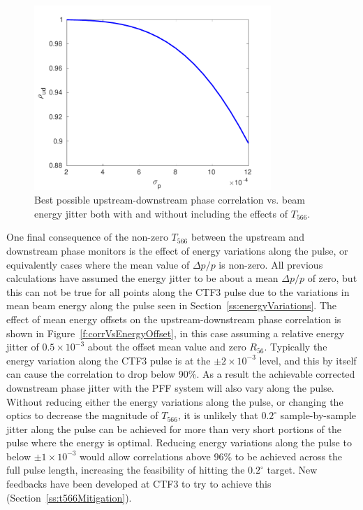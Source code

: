 \begin{figure}
  \centering
  \includegraphics[width=0.8\textwidth]{Figures/propagation/maxCorrWithT566}
  \caption{Best possible upstream-downstream phase correlation vs. beam energy jitter both with and without including the effects of \(T_{566}\).}
  \label{f:maxCorrWithT566}
\end{figure}

One final consequence of the non-zero \(T_{566}\) between the upstream and downstream phase monitors is the effect of energy variations along the pulse, or equivalently cases where the mean value of \(\Delta p/p\) is non-zero. All previous calculations have assumed the energy jitter to be about a mean \(\Delta p / p\) of zero, but this can not be true for all points along the CTF3 pulse due to the variations in mean beam energy along the pulse seen in Section~\ref{ss:energyVariations}. The effect of mean energy offsets on the upstream-downstream phase correlation is shown in Figure~\ref{f:corrVsEnergyOffset}, in this case assuming a relative energy jitter of \(0.5\times10^{-3}\) about the offset mean value and zero \(R_{56}\). Typically the energy variation along the CTF3 pulse is at the \(\pm2\times10^{-3}\) level, and this by itself can cause the correlation to drop below 90\%. As a result the achievable corrected downstream phase jitter with the PFF system will also vary along the pulse. Without reducing either the energy variations along the pulse, or changing the optics to decrease the magnitude of \(T_{566}\), it is unlikely that \(0.2^\circ\) sample-by-sample jitter along the pulse can be achieved for more than very short portions of the pulse where the energy is optimal. Reducing energy variations along the pulse to below \(\pm1 \times10^{-3}\) would allow correlations above 96\% to be achieved across the full pulse length, increasing the feasibility of hitting the \(0.2^\circ\) target. New feedbacks have been developed at CTF3 to try to achieve this (Section~\ref{ss:t566Mitigation}).


